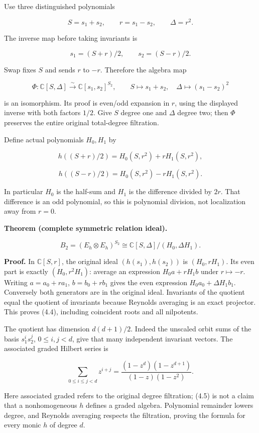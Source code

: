 \documentclass[
]{article}
\begin{document}
Use three distinguished polynomials

\[S=s_1+s_2,\qquad r=s_1-s_2,\qquad \Delta=r^2.\tag{4.1}\]

The inverse map before taking invariants is

\[s_1=(S+r)/2,\qquad s_2=(S-r)/2.\]

Swap fixes \(S\) and sends \(r\) to \(-r\). Therefore the algebra map

\[\Phi:\mathbb C[S,\Delta]\xrightarrow{\sim}\mathbb C[s_1,s_2]^{S_2},\qquad
S\mapsto s_1+s_2,\quad\Delta\mapsto(s_1-s_2)^2\tag{4.2}\]

is an isomorphism. Its proof is even/odd expansion in \(r\), using the
displayed inverse with both factors \(1/2\). Give \(S\) degree one and
\(\Delta\) degree two; then \(\Phi\) preserves the entire original
total-degree filtration.

Define actual polynomials \(H_0,H_1\) by

\[h((S+r)/2)=H_0(S,r^2)+rH_1(S,r^2),\]

\[h((S-r)/2)=H_0(S,r^2)-rH_1(S,r^2).\tag{4.3}\]

In particular \(H_0\) is the half-sum and \(H_1\) is the difference
divided by \(2r\). That difference is an odd polynomial, so this is
polynomial division, not localization away from \(r=0\).

\textbf{Theorem (complete symmetric relation ideal).}

\[\boxed{B_2=(E_h\otimes E_h)^{S_2}
\cong\mathbb C[S,\Delta]/(H_0,\Delta H_1).}\tag{4.4}\]

\textbf{Proof.} In \(\mathbb C[S,r]\), the original ideal
\((h(s_1),h(s_2))\) is \((H_0,rH_1)\). Its even part is exactly
\((H_0,r^2H_1)\): average an expression \(H_0a+rH_1b\) under
\(r\mapsto-r\). Writing \(a=a_0+r a_1\), \(b=b_0+r b_1\) gives the even
expression \(H_0a_0+\Delta H_1b_1\). Conversely both generators are in
the original ideal. Invariants of the quotient equal the quotient of
invariants because Reynolds averaging is an exact projector. This proves
(4.4), including coincident roots and all nilpotents.

The quotient has dimension \(d(d+1)/2\). Indeed the unscaled orbit sums
of the basis \(s_1^is_2^j\), \(0\le i,j<d\), give that many independent
invariant vectors. The associated graded Hilbert series is

\[\sum_{0\le i\le j<d}z^{i+j}
=\frac{(1-z^d)(1-z^{d+1})}{(1-z)(1-z^2)}.\tag{4.5}\]

Here associated graded refers to the original degree filtration; (4.5)
is not a claim that a nonhomogeneous \(h\) defines a graded algebra.
Polynomial remainder lowers degree, and Reynolds averaging respects the
filtration, proving the formula for every monic \(h\) of degree \(d\).
\end{document}
